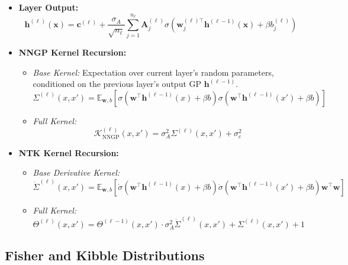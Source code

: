 \documentclass[a4paper]{article}
\theoremstyle{plain}
\theoremstyle{definition}
\theoremstyle{remark}
\begin{document}
\begin{tcolorbox}[colback=blue!15,colframe=blue!80!black,title={\textbf{Summary of Formulas}},enhanced,drop shadow,boxrule=2pt]
    \begin{itemize}
        \item \textbf{Layer Output:}
        \[ \boxed{\bm{h}^{(\ell)}(\bm{x}) = \bm{c}^{(\ell)} + \frac{\sigma_A}{\sqrt{n_\ell}} \sum_{j=1}^{n_\ell} \bm{A}_j^{(\ell)} \sigma\left(\bm{w}_j^{(\ell)\top} \bm{h}^{(\ell-1)}(\bm{x}) + \beta b_j^{(\ell)}\right)} \]
    
        \item \textbf{NNGP Kernel Recursion:}
        \begin{itemize}
            \item \textit{Base Kernel:} Expectation over current layer's random parameters, conditioned on the previous layer's output GP $\bm{h}^{(\ell-1)}$.
            \[ \boxed{\Sigma^{(\ell)}(x, x') = \mathbb{E}_{\bm{w}, b} \left[ \sigma\left(\bm{w}^\top \bm{h}^{(\ell-1)}(x) + \beta b\right) \sigma\left(\bm{w}^\top \bm{h}^{(\ell-1)}(x') + \beta b\right) \right]} \]
            \item \textit{Full Kernel:}
            \[ \boxed{\mathcal{K}_{\text{NNGP}}^{(\ell)}(x, x') = \sigma_A^2 \Sigma^{(\ell)}(x, x') + \sigma_c^2} \]
        \end{itemize}
    
        \item \textbf{NTK Kernel Recursion:}
        \begin{itemize}
            \item \textit{Base Derivative Kernel:}
            \[ \boxed{\dot{\Sigma}^{(\ell)}(x, x') = \mathbb{E}_{\bm{w}, b} \left[ \dot{\sigma}\left(\bm{w}^\top \bm{h}^{(\ell-1)}(x) + \beta b\right) \dot{\sigma}\left(\bm{w}^\top \bm{h}^{(\ell-1)}(x') + \beta b\right) \bm{w}^\top\bm{w} \right]} \]
            \item \textit{Full Kernel:}
            \[ \boxed{\Theta^{(\ell)}(x, x') = \Theta^{(\ell-1)}(x, x') \cdot \sigma_A^2  \dot{\Sigma}^{(\ell)}(x, x') + \Sigma^{(\ell)}(x, x')+1} \]
        \end{itemize}
    \end{itemize}
    \end{tcolorbox}






\subsection{Fisher and Kibble Distributions}
\end{document}
